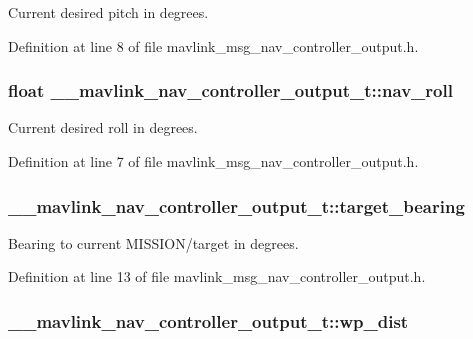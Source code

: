 Current desired pitch in degrees. 



Definition at line 8 of file mavlink\-\_\-msg\-\_\-nav\-\_\-controller\-\_\-output.\-h.

\hypertarget{struct____mavlink__nav__controller__output__t_a4d11bb9b43d937ab389aab2982ddd1c1}{
\subsubsection[{nav\-\_\-roll}]{\setlength{\rightskip}{0pt plus 5cm}float \-\_\-\-\_\-mavlink\-\_\-nav\-\_\-controller\-\_\-output\-\_\-t\-::nav\-\_\-roll}}\label{struct____mavlink__nav__controller__output__t_a4d11bb9b43d937ab389aab2982ddd1c1}


Current desired roll in degrees. 



Definition at line 7 of file mavlink\-\_\-msg\-\_\-nav\-\_\-controller\-\_\-output.\-h.

\hypertarget{struct____mavlink__nav__controller__output__t_a4601945c2201a6dcaca7acc5154e087e}{
\subsubsection[{target\-\_\-bearing}]{ \-\_\-\-\_\-mavlink\-\_\-nav\-\_\-controller\-\_\-output\-\_\-t\-::target\-\_\-bearing}}\label{struct____mavlink__nav__controller__output__t_a4601945c2201a6dcaca7acc5154e087e}


Bearing to current M\-I\-S\-S\-I\-O\-N/target in degrees. 



Definition at line 13 of file mavlink\-\_\-msg\-\_\-nav\-\_\-controller\-\_\-output.\-h.

\hypertarget{struct____mavlink__nav__controller__output__t_aa7d7186c64fdd4cf8a0ace5bd2a071f1}{
\subsubsection[{wp\-\_\-dist}]{ \-\_\-\-\_\-mavlink\-\_\-nav\-\_\-controller\-\_\-output\-\_\-t\-::wp\-\_\-dist}}\label{struct____mavlink__nav__controller__output__t_aa7d7186c64fdd4cf8a0ace5bd2a071f1}


